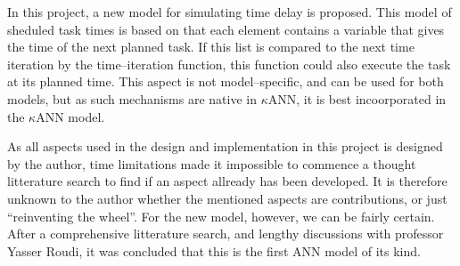 






In this project, a new model for simulating time delay is proposed.
This model of sheduled task times is based on that each element contains a variable that gives the time of the next planned task.
If this list is compared to the next time iteration by the time--iteration function, this function could also execute the task at its planned time.
This aspect is not model--specific, and can be used for both models, but as such mechanisms are native in $\kappa$ANN, it is best incoorporated in the $\kappa$ANN model.

As all aspects used in the design and implementation in this project is designed by the author, time limitations made it impossible to commence a thought litterature search to find if an aspect allready has been developed.
It is therefore unknown to the author whether the mentioned aspects are contributions, or just ``reinventing the wheel''.
For the new model, however, we can be fairly certain.
After a comprehensive litterature search, and lengthy discussions with professor Yasser Roudi, it was concluded that this is the first ANN model of its kind.









